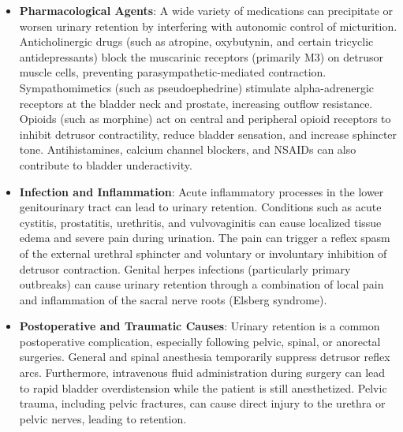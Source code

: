 \begin{itemize}
    \item \textbf{Pharmacological Agents}: A wide variety of medications can precipitate or worsen urinary retention by interfering with autonomic control of micturition. Anticholinergic drugs (such as atropine, oxybutynin, and certain tricyclic antidepressants) block the muscarinic receptors (primarily M3) on detrusor muscle cells, preventing parasympathetic-mediated contraction. Sympathomimetics (such as pseudoephedrine) stimulate alpha-adrenergic receptors at the bladder neck and prostate, increasing outflow resistance. Opioids (such as morphine) act on central and peripheral opioid receptors to inhibit detrusor contractility, reduce bladder sensation, and increase sphincter tone. Antihistamines, calcium channel blockers, and NSAIDs can also contribute to bladder underactivity.
    \item \textbf{Infection and Inflammation}: Acute inflammatory processes in the lower genitourinary tract can lead to urinary retention. Conditions such as acute cystitis, prostatitis, urethritis, and vulvovaginitis can cause localized tissue edema and severe pain during urination. The pain can trigger a reflex spasm of the external urethral sphincter and voluntary or involuntary inhibition of detrusor contraction. Genital herpes infections (particularly primary outbreaks) can cause urinary retention through a combination of local pain and inflammation of the sacral nerve roots (Elsberg syndrome).
    \item \textbf{Postoperative and Traumatic Causes}: Urinary retention is a common postoperative complication, especially following pelvic, spinal, or anorectal surgeries. General and spinal anesthesia temporarily suppress detrusor reflex arcs. Furthermore, intravenous fluid administration during surgery can lead to rapid bladder overdistension while the patient is still anesthetized. Pelvic trauma, including pelvic fractures, can cause direct injury to the urethra or pelvic nerves, leading to retention.
\end{itemize}

